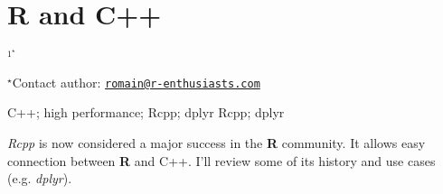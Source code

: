 \documentclass[\main/boa.tex]{subfiles}
\begin{document}
\section{R and C++}

\begin{center}
  {\bf {}$^{1^\star}$}
\end{center}

\vskip 0.3cm

\begin{affiliations}
$^\star$Contact author: \href{mailto:romain@r-enthusiasts.com}{\nolinkurl{romain@r-enthusiasts.com}}\\
\end{affiliations}

\vskip 0.5cm

\begin{minipage}{0.915\textwidth}
\keywords C++; high performance; Rcpp; dplyr
\packages Rcpp; dplyr
\end{minipage}

\vskip 0.8cm

\emph{Rcpp} is now considered a major success in the \textbf{R}
community. It allows easy connection between \textbf{R} and C++. I'll
review some of its history and use cases (e.g. \emph{dplyr}).
\end{document}
